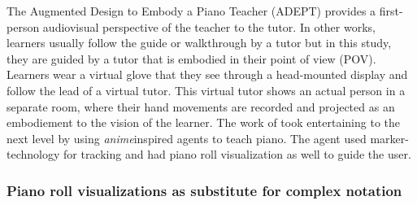 \documentclass[sigconf, screen, review]{acmart}
\begin{document}

The Augmented Design to Embody a Piano Teacher (ADEPT) \cite{gerry2019adept} provides a first-person audiovisual perspective of the teacher to the tutor. In other works, learners usually follow the guide or walkthrough by a tutor but in this study, they are guided by a tutor that is embodied in their point of view (POV). Learners wear a virtual glove that they see through a head-mounted display and follow the lead of a virtual tutor. This virtual tutor shows an actual person in a separate room, where their hand movements are recorded and projected as an embodiement to the vision of the learner. The work of \cite{goodwin2013key} took entertaining to the next level by using \textit{anime}\textendash inspired agents to teach piano. The agent used marker-technology for tracking and had piano roll visualization as well to guide the user. 

\subsubsection{Piano roll visualizations as substitute for complex notation}
\label{subsec: pianoroll}
\end{document}
